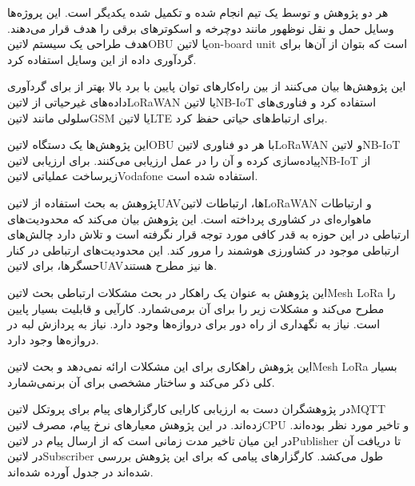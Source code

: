 

هر دو پژوهش  و  توسط یک تیم انجام شده و تکمیل شده یکدیگر است. این پروژه‌ها وسایل حمل و نقل نوظهور مانند دوچرخه و اسکوترهای برقی را هدف قرار می‌دهند.
هدف طراحی یک سیستم ‌لاتین{OBU} یا ‌لاتین{on-board unit} است که بتوان از آن‌ها برای گردآوری داده از این وسایل استفاده کرد.

این پژوهش‌ها بیان می‌کنند از بین راه‌کارهای توان پایین با برد بالا بهتر از برای گردآوری داده‌های غیرحیاتی از ‌لاتین{LoRaWAN} یا ‌لاتین{NB-IoT} استفاده کرد
و فناوری‌های سلولی مانند ‌لاتین{GSM} یا ‌لاتین{LTE} برای ارتباط‌های حیاتی حفظ کرد.

این پژوهش‌ها یک دستگاه ‌لاتین{OBU} با هر دو فناوری ‌لاتین{LoRaWAN} و ‌لاتین{NB-IoT} پیاده‌سازی کرده و آن را در عمل ارزیابی می‌کنند.
برای ارزیابی ‌لاتین{NB-IoT} از زیرساخت عملیاتی ‌لاتین{Vodafone} استفاده شده است.



پژوهش  به بحث استفاده از ‌لاتین{UAV}ها، ارتباطات ‌لاتین{LoRaWAN} و ارتباطات ماهواره‌ای در کشاوری پرداخته است.
این پژوهش بیان می‌کند که محدودیت‌های ارتباطی در این حوزه به قدر کافی مورد توجه قرار نگرفته است و تلاش دارد چالش‌های ارتباطی موجود در کشاورزی هوشمند را مرور کند.
این محدودیت‌های ارتباطی در کنار حسگرها، برای ‌لاتین{UAV}ها نیز مطرح هستند.

این پژوهش به عنوان یک راهکار در بحث مشکلات ارتباطی بحث ‌لاتین{Mesh LoRa} را مطرح می‌کند و مشکلات زیر را برای آن برمی‌شمارد.
 کارآیی و قابلیت بسیار پایین است.
 نیاز به نگهداری از راه دور برای دروازه‌ها وجود دارد.
 نیاز به پردازش لبه در دروازه‌ها وجود دارد.

این پژوهش راهکاری برای این مشکلات ارائه نمی‌دهد و بحث ‌لاتین{Mesh LoRa} بسیار کلی ذکر می‌کند و ساختار مشخصی برای آن برنمی‌شمارد.



در  پژوهشگران دست به ارزیابی کارایی کارگزار‌های پیام برای پروتکل ‌لاتین{MQTT} زده‌اند. در این پژوهش معیارهای نرخ پیام، مصرف ‌لاتین{CPU} و تاخیر مورد نظر بوده‌اند.
در این میان تاخیر مدت زمانی است که از ارسال پیام در ‌لاتین{Publisher} تا دریافت آن در ‌لاتین{Subscriber} طول می‌کشد.
کارگزار‌های پیامی که برای این پژوهش بررسی شده‌اند در جدول  آورده شده‌اند.

